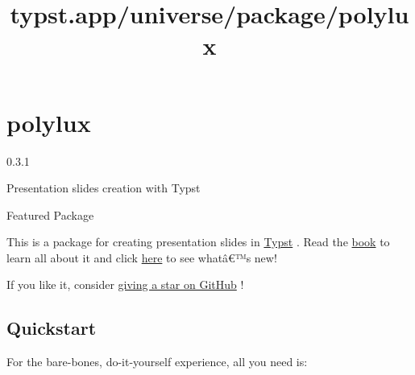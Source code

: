 \title{typst.app/universe/package/polylux}

\label{banner}
\section{polylux}\label{polylux}

{ 0.3.1 }

Presentation slides creation with Typst

{ } Featured Package

\label{readme}
This is a package for creating presentation slides in
\href{https://typst.app/}{Typst} . Read the
\href{https://andreaskroepelin.github.io/polylux/book}{book} to learn
all about it and click
\href{https://andreaskroepelin.github.io/polylux/book/changelog.html}{here}
to see whatâ€™s new!

If you like it, consider
\href{https://github.com/andreasKroepelin/polylux}{giving a star on
GitHub} !

\href{https://andreaskroepelin.github.io/polylux/book}{}
\href{https://github.com/andreasKroepelin/polylux/releases/latest/download/demo.pdf}{}

\subsection{Quickstart}\label{quickstart}

For the bare-bones, do-it-yourself experience, all you need is:

